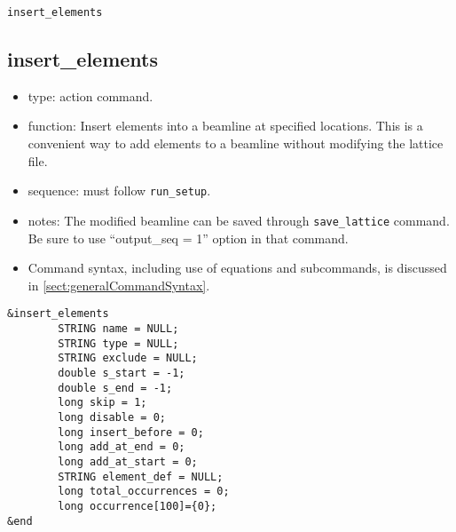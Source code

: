 \documentclass[11pt]{article}
\begin{document}
\newpage
\begin{center}{\Large\verb|insert_elements|}\end{center}
\subsection{insert\_elements \label{subsec:insertelements}}

\begin{itemize}
\item type: action command.
\item function: Insert elements into a beamline at specified locations. This is a convenient way to
 add elements to a beamline without modifying the lattice file.
\item sequence: must follow \verb|run_setup|.
\item notes: 
	The modified beamline can be saved through \verb|save_lattice|
   command. Be sure to use ``output\_seq = 1'' option in that command.  
\item Command syntax, including use of equations and subcommands, is discussed in \ref{sect:generalCommandSyntax}.
\end{itemize}

\begin{verbatim}
&insert_elements
        STRING name = NULL;
        STRING type = NULL;
        STRING exclude = NULL;
        double s_start = -1;
        double s_end = -1;
        long skip = 1;
        long disable = 0;
        long insert_before = 0;
        long add_at_end = 0;
        long add_at_start = 0;
        STRING element_def = NULL;
        long total_occurrences = 0;
        long occurrence[100]={0};
&end
\end{verbatim}
\end{document}
